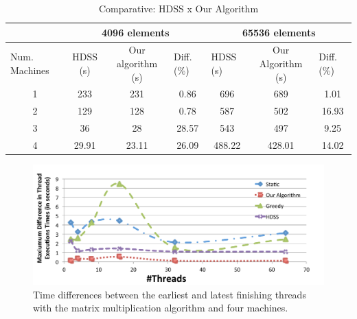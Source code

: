 \documentclass[journal]{IEEEtran}
\begin{document}
\begin{table}[htb]
\centering
\caption{Comparative: HDSS x Our Algorithm}

\begin{tabular}{c|c|c|c|c|c|c|}
\cline{2-7}
\multicolumn{1}{l|}{}                 & \multicolumn{3}{c|}{4096 elements}                              & \multicolumn{3}{c|}{65536 elements}                                                  \\ \hline
\multicolumn{1}{|l|}{Num. Machines} & HDSS (s) & Our algorithm (s) & \multicolumn{1}{l|}{Diff. (\%)} & \multicolumn{1}{l|}{HDSS (s)} & Our Algorithm (s) & \multicolumn{1}{l|}{Diff. (\%)} \\ \hline
\multicolumn{1}{|c|}{1 }       & 233     & 231              &   0.86                        
			 & 696                          &   689             &    1.01                        \\ \hline
\multicolumn{1}{|c|}{2 }      & 129     & 128              &    0.78                         
				& 587                         & 502             & 16.93                     \\ \hline
\multicolumn{1}{|c|}{3 }      & 36     & 28              & 28.57                            
			&          543                &    497           &      9.25                          \\ \hline
\multicolumn{1}{|c|}{4 }      & 29.91     & 23.11            & 26.09                       
			    & 488.22                          & 428.01              &     14.02            \\ \hline
\end{tabular}
\label{table: comparativo}
\end{table}

\begin{figure}[htb]
	\begin{center}
	\centering
			\includegraphics[scale=0.33]{MaximoDiferenca_matrix_novo.pdf}
	\caption{Time differences between the earliest and latest finishing
          threads with the matrix multiplication algorithm and four machines.}
	\label{fig:diferencaThreads}
	\end{center}
\end{figure}
\end{document}
